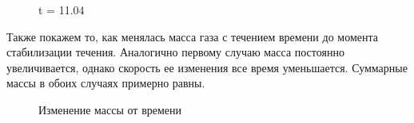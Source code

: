 \documentclass[specialist,subf,href,colorlinks=true,12pt
,times,mtpro,specialist
]{disser}
\begin{document}
\begin{figure}[H]
\begin{minipage}[h]{0.49\linewidth}
\end{minipage}
\hfill
\begin{minipage}[h]{0.49\linewidth}
\end{minipage}
\caption*{t = 11.04}
\end{figure}

Также покажем то, как менялась масса газа с течением времени до момента стабилизации течения. Аналогично первому случаю масса постоянно увеличивается, однако скорость ее изменения все время уменьшается. Суммарные массы в обоих случаях примерно равны. 

\begin{figure}[H]
\caption*{Изменение массы от времени}
\end{figure}
\end{document}
